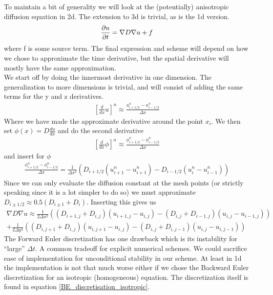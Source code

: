 To maintain a bit of generality we will look at the (potentially) anisotropic diffusion equation in 2d. The extension to 3d is trivial, as is the 1d version.
\begin{equation}
 \frac{\partial u}{\partial t} = \nabla D\nabla u +f
\end{equation}
where f is some source term. 
The final expression and scheme will depend on how we chose to approximate the time derivative, but the spatial derivative will mostly have the same approximation. \\
We start off by doing the innermost derivative in one dimension. 
The generalization to more dimensions is trivial, and will consist of adding the same terms for the y and z derivatives. 
\begin{align*}
 \left[\frac{d}{dx}u\right]^n \approx \frac{u^n_{i+1/2}-u^n_{i-1/2}}{\Delta x}
\end{align*}
Where we have made the approximate derivative around the point $x_i$. 
We then set $\phi(x)=D\frac{du}{dx}$ and do the second derivative
\begin{align*}
  \left[\frac{d}{dx}\phi\right]^n \approx \frac{\phi^n_{i+1/2}-\phi^n_{i-1/2}}{\Delta x}
\end{align*}
and insert for $\phi$
\begin{align*}
 \frac{\phi^n_{i+1/2}-\phi^n_{i-1/2}}{\Delta x} = \frac{1}{\Delta x^2}\left(D_{i+1/2}(u^n_{i+1}-u^n_{i+1}) -D_{i-1/2}(u^n_{i}-u^n_{i-1})\right)
\end{align*}
Since we can only evaluate the diffusion constant at the mesh points (or strictly speaking since it is a lot simpler to do so) we must approximate $D_{i\pm1/2}\approx0.5(D_{i\pm1}+D_i)$. 
Inserting this gives us 
\begin{align*}
 \nabla D\nabla u\approx\frac{1}{2\Delta x^2}\left((D_{i+1,j}+D_{i,j})(u_{i+1,j}-u_{i,j})-(D_{i,j}+D_{i-1,j})(u_{i,j}-u_{i-1,j})\right) \\
 +\frac{1}{2\Delta y^2}\left((D_{i,j+1}+D_{i,j})(u_{i,j+1}-u_{i,j})-(D_{i,j}+D_{i,j-1})(u_{i,j}-u_{i,j-1})\right)
\end{align*}
The Forward Euler discretization has one drawback which is its instability for ``large'' $\Delta t$. 
A common tradeoff for explicit numerical schemes. 
We could sacrifice ease of implementation for unconditional stability in our scheme. 
At least in 1d the implementation is not that much worse either if we chose the Backward Euler discretization for an isotropic (homogeneous) equation. 
The discretization itself is found in equation \ref{BE_discretisation_isotropic}. 
